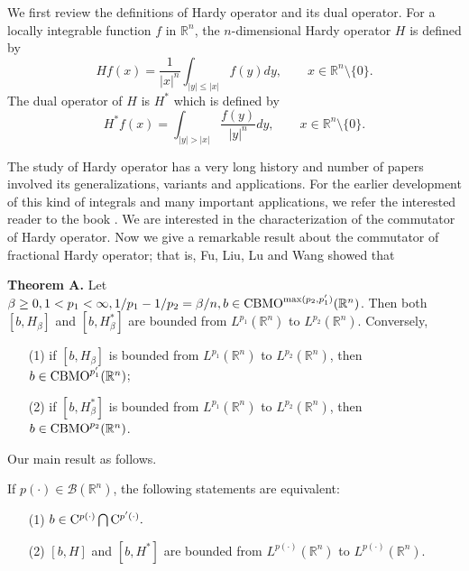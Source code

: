 \documentclass{amse-new}
\numberwithin{equation}{section} %
\begin{document}
We first review the definitions of Hardy operator and its dual operator. For a locally integrable function $f$ in $\mathbb{R}^n$, the $n$-dimensional Hardy operator $H$ is defined by
$$Hf(x)=\frac{1}{|x|^{n}}\int_{|y|\leq |x|}f(y)dy,\qquad x\in \mathbb{R}^n\setminus \{0\}.$$
The dual operator of $H$ is $H^{*}$ which is defined by
$$H^{*}f(x)=\int_{|y|>|x|}\frac{f(y)}{|y|^{n}}dy, \qquad x\in \mathbb{R}^n\setminus \{0\}.$$

The study of Hardy operator has a very long history and number of papers involved its generalizations, variants and applications. For the earlier development of this kind of integrals and many important applications, we refer the interested reader to the book \cite{HLP}. We are interested in the characterization of the commutator of Hardy operator. Now we give a remarkable result about the commutator of fractional Hardy operator; that is, Fu, Liu, Lu and Wang \cite{FLLW} showed that

\textbf{Theorem A.}
Let $\beta\geq 0, 1<p_{1}<\infty, 1/p_{1}-1/p_{2}=\beta/n, b\in {\rm CBMO}^{\max(p_{2},p_{1}')}(\mathbb{R}^n)$. Then both $[b,H_{\beta}]$ and $[b,H^{*}_{\beta}]$ are bounded from $L^{p_{1}}(\mathbb{R}^n)$ to $L^{p_{2}}(\mathbb{R}^n)$. Conversely,
\begin{enumerate}
\item [\rm(1)] if $[b,H_{\beta}]$ is bounded from $L^{p_{1}}(\mathbb{R}^n)$ to $L^{p_{2}}(\mathbb{R}^n)$, then $b\in {\rm CBMO}^{p'_{1}}(\mathbb{R}^n)$;
\item [\rm(2)] if $[b,H^{*}_{\beta}]$ is bounded from $L^{p_{1}}(\mathbb{R}^n)$ to $L^{p_{2}}(\mathbb{R}^n)$, then $b\in {\rm CBMO}^{p_{2}}(\mathbb{R}^n)$.
\end{enumerate}

Our main result as follows.
\begin{theorem}\label{main1}
If $p(\cdot)\in \mathcal{B}(\mathbb{R}^n)$, the following statements are equivalent:
\begin{enumerate}
\item [\rm(1)] $b\in {\rm C}^{p(\cdot)}\bigcap {\rm C}^{p'(\cdot)}.$
\item [\rm(2)] $[b,H]$ and $[b,H^{*}]$ are bounded from $L^{p(\cdot)}(\mathbb{R}^n)$ to $L^{p(\cdot)}(\mathbb{R}^n)$.
\end{enumerate}
\end{theorem}
\end{document}
